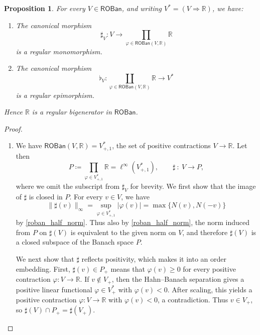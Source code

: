 \documentclass[11pt,onecolumn]{article}
\newcommand{\R}{\mathbb{R}}
\newcommand{\ROBan}{\mathsf{ROBan}}
\theoremstyle{plain}
\newtheorem{proposition}[proposition]{Proposition}
\theoremstyle{remark}
\theoremstyle{definition}
\begin{document}
\begin{proposition}
	\label{prop:roban_regular_bigenerator}
	For every $V \in \ROBan$, and writing $V^* = (V \Rightarrow \R)$, we have:
	\begin{enumerate}
		\item The canonical morphism
			\[
				\sharp_V \colon V \longrightarrow \prod_{\varphi \in \ROBan(V,\R)} \R
			\]
			is a regular monomorphism.
		\item The canonical morphism
			\[
				\flat_V \colon \coprod_{\varphi \in \ROBan(V,\R)} \R \longrightarrow V^*
			\]
			is a regular epimorphism.
	\end{enumerate}
	Hence $\R$ is a regular bigenerator in $\ROBan$.
\end{proposition}

\begin{proof}
	\begin{enumerate}
		\item We have $\ROBan(V,\R) = V^*_{+, 1}$, the set of positive contractions $V \to \R$.
			Let then
			\[
				P \coloneqq \prod_{\varphi \in V^*_{+,1}} \R = \ell^\infty(V^*_{+,1}),
				\qquad
				\sharp \: : \: V \longrightarrow P,
			\]
			where we omit the subscript from $\sharp_V$ for brevity.
			We first show that the image of $\sharp$ is closed in $P$.
			For every $v \in V$, we have
			\[
				\|\sharp(v)\|_\infty
				=
				\sup_{\varphi \in V^*_{+,1}} |\varphi(v)|
				=
				\max\{N(v),N(-v)\}
			\]
			by \cref{roban_half_norm}.
			Thus also by \cref{roban_half_norm},
			the norm induced from $P$ on $\sharp(V)$ is equivalent to the given norm on $V$, and therefore $\sharp(V)$ is a closed subspace of the Banach space $P$.

			We next show that $\sharp$ reflects positivity, which makes it into an order embedding.
			First, $\sharp(v) \in P_+$ means that $\varphi(v) \ge 0$ for every positive contraction $\varphi \colon V \to \R$.
			If $v \notin V_+$, then the Hahn--Banach separation gives a positive linear functional $\varphi \in V^*_+$ with $\varphi(v) < 0$.
			After scaling, this yields a positive contraction $\varphi \colon V \to \R$ with $\varphi(v) < 0$, a contradiction.
			Thus $v \in V_+$, so $\sharp(V) \cap P_+ = \sharp(V_+)$.


\end{enumerate}
\end{proof}
\end{document}
